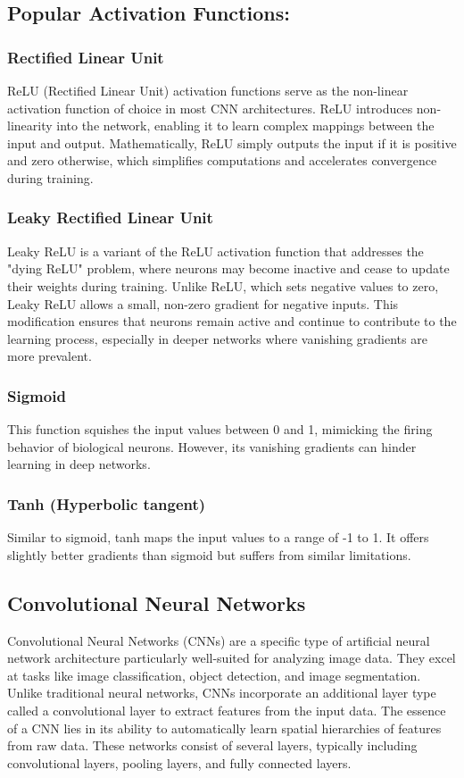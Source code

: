 \documentclass{article}
\begin{document}
\subsection{Popular Activation Functions:}
\subsubsection{Rectified Linear Unit}
ReLU (Rectified Linear Unit) activation functions serve as the non-linear activation function of choice in most CNN architectures. ReLU introduces non-linearity into the network, enabling it to learn complex mappings between the input and output. Mathematically, ReLU simply outputs the input if it is positive and zero otherwise, which simplifies computations and accelerates convergence during training.

\subsubsection{Leaky Rectified Linear Unit}
Leaky ReLU is a variant of the ReLU activation function that addresses the "dying ReLU" problem, where neurons may become inactive and cease to update their weights during training. Unlike ReLU, which sets negative values to zero, Leaky ReLU allows a small, non-zero gradient for negative inputs. This modification ensures that neurons remain active and continue to contribute to the learning process, especially in deeper networks where vanishing gradients are more prevalent.

\subsubsection{Sigmoid}
This function squishes the input values between 0 and 1, mimicking the firing behavior of biological neurons. However, its vanishing gradients can hinder learning in deep networks.

\subsubsection{Tanh (Hyperbolic tangent)}
Similar to sigmoid, tanh maps the input values to a range of -1 to 1. It offers slightly better gradients than sigmoid but suffers from similar limitations.

\subsection{Convolutional Neural Networks}
Convolutional Neural Networks (CNNs) are a specific type of artificial neural network architecture particularly well-suited for analyzing image data. They excel at tasks like image classification, object detection, and image segmentation. Unlike traditional neural networks, CNNs incorporate an additional layer type called a convolutional layer to extract features from the input data. The essence of a CNN lies in its ability to automatically learn spatial hierarchies of features from raw data. These networks consist of several layers, typically including convolutional layers, pooling layers, and fully connected layers.
\end{document}
